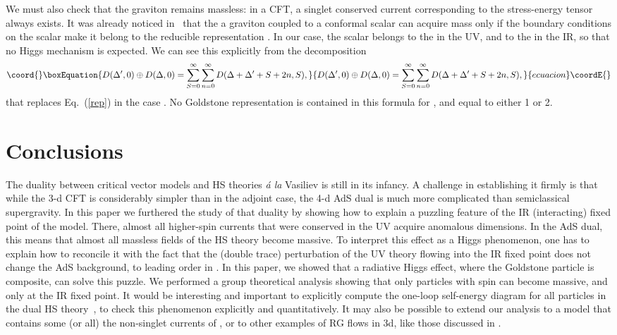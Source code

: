\documentclass[a4paper,12pt]{article}
\begin{document}
We must also check that the graviton remains massless: in a CFT, a
singlet conserved current corresponding to the stress-energy tensor
always exists.  It was already noticed in~\cite{porrati} that the a
graviton coupled to a conformal scalar can acquire mass only if the
boundary conditions on the scalar make it belong to the reducible
representation \coordHE{}.  In our case, the scalar belongs
to the \coordHE{} in the UV, and to the \coordHE{} in the IR, so that no
Higgs mechanism is expected.  We can see this explicitly from the
decomposition
\begin{equation}\coord{}\boxEquation{
D(\Delta^\prime,0)\oplus D(\Delta,0)=\sum_{S=0}^\infty\sum_{n=0}^\infty 
D(\Delta+\Delta^\prime+S+2n,S),
\label{rep2}
}{
D(\Delta^\prime,0)\oplus D(\Delta,0)=\sum_{S=0}^\infty\sum_{n=0}^\infty 
D(\Delta+\Delta^\prime+S+2n,S),
}{ecuacion}\coordE{}\end{equation}
that replaces Eq.~(\ref{rep}) in the case \coordHE{}. No Goldstone
representation \coordHE{} is contained in this formula for
\myHighlight{$\Delta=\Delta^\prime$}\coordHE{}, and \coordHE{} equal to either 1 or 2.

\section{Conclusions}

The duality between \coordHE{} critical vector models and HS theories {\em
\'a la} Vasiliev is still in its infancy. A challenge in establishing
it firmly is that while the 3-d CFT is considerably simpler than in
the adjoint case, the 4-d AdS dual is much more complicated than
semiclassical supergravity.  In this paper we furthered the study of
that duality by showing how to explain a puzzling feature of the IR
(interacting) fixed point of the \coordHE{} model.  There, almost all
higher-spin currents that were conserved in the UV acquire anomalous
dimensions. In the AdS dual, this means that almost all massless
fields of the HS theory become massive.  To interpret this effect as a
Higgs phenomenon, one has to explain how to reconcile it with the fact
that the (double trace) perturbation of the UV theory flowing into the
IR fixed point does not change the AdS background, to leading order in
\coordHE{}. In this paper, we showed that a radiative Higgs effect, where
the Goldstone particle is composite, can solve this puzzle. We
performed a group theoretical analysis showing that only particles
with spin \coordHE{} can become massive, and only at the IR fixed point.
It would be interesting and important to explicitly compute the
one-loop self-energy diagram for all particles in the dual HS
theory~\cite{v}, to check this phenomenon explicitly and
quantitatively.  It may also be possible to extend our analysis to a
model that contains some (or all) the non-singlet currents of \coordHE{},
or to other examples of RG flows in 3d, like those discussed in
\cite{anselmi}.
\end{document}

